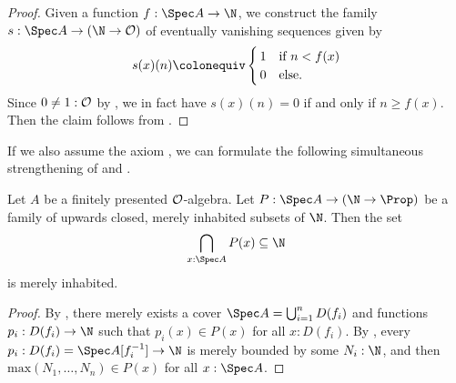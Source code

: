 \begin{proof}
  Given a function $f : \Spec A \to \N$,
  we construct the family $s : \Spec A \to (\N \to \A)$
  of eventually vanishing sequences
  given by
  \[
    s(x)(n) \colonequiv
    \begin{cases}
      \,1 &\text{if $n < f(x)$}\\
      \,0 &\text{else} \rlap{.}
    \end{cases}
  \]
  Since $0 \neq 1 : \mathcal O$ by ,
  we in fact have $s(x)(n) = 0$ if and only if $n \geq f(x)$.
  Then the claim follows from .
\end{proof}

If we also assume the axiom ,
we can formulate the following simultaneous strengthening
of 
and .

\begin{proposition}%
  \label{strengthened-boundedness}
  Let $A$ be a finitely presented $\mathcal O$-algebra.
  Let $P : \Spec A \to (\N \to \Prop)$
  be a family of upwards closed, merely inhabited subsets of $\N$.
  Then the set
  \[ \bigcap_{x : \Spec A} P(x) \subseteq \N \]
  is merely inhabited.
\end{proposition}

\begin{proof}
  By ,
  there merely exists a cover
  $\Spec A = \bigcup_{i = 1}^n D(f_i)$
  and functions $p_i : D(f_i) \to \N$
  such that $p_i(x) \in P(x)$ for all $x : D(f_i)$.
  By ,
  every $p_i : D(f_i) = \Spec A[f_i^{-1}] \to \N$
  is merely bounded by some $N_i : \N$,
  and then $\mathrm{max}(N_1, \dots, N_n) \in P(x)$ for all $x : \Spec A$.
\end{proof}

